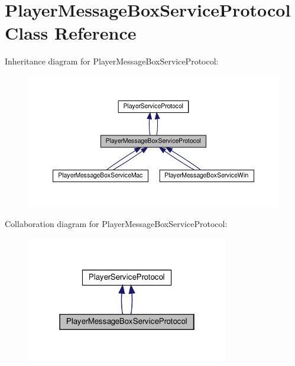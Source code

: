 \hypertarget{classPlayerMessageBoxServiceProtocol}{}\section{Player\+Message\+Box\+Service\+Protocol Class Reference}
\label{classPlayerMessageBoxServiceProtocol}


Inheritance diagram for Player\+Message\+Box\+Service\+Protocol\+:
\nopagebreak
\begin{figure}[H]
\begin{center}
\leavevmode
\includegraphics[width=350pt]{classPlayerMessageBoxServiceProtocol__inherit__graph}
\end{center}
\end{figure}


Collaboration diagram for Player\+Message\+Box\+Service\+Protocol\+:
\nopagebreak
\begin{figure}[H]
\begin{center}
\leavevmode
\includegraphics[width=250pt]{classPlayerMessageBoxServiceProtocol__coll__graph}
\end{center}
\end{figure}
